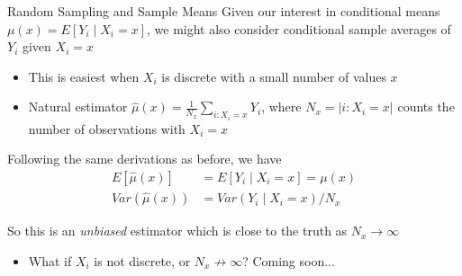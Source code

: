 \documentclass[11pt,english,handout]{beamer}
\begin{document}
\begin{frame}{Random Sampling and Sample Means}
\vspace{0.2cm}
Given our interest in conditional means $\mu(x)=E[Y_i\mid X_i=x]$, we might also consider conditional sample averages of $Y_i$ given $X_i=x$
\pause{}


\begin{itemize}
\item This is easiest when $X_i$ is discrete with a small number of values $x$
\vspace{0.1cm}\pause{}
\item Natural estimator $\hat{\mu}(x)=\frac{1}{N_x}\sum_{i:X_i=x}Y_i$, where $N_x=|i:X_i=x|$ counts the number of observations with $X_i=x$
\end{itemize}
\vspace{0.4cm}
\pause{}

Following the same derivations as before, we have 
\begin{align*}
E[\hat{\mu}(x)]&=E[Y_i\mid X_i=x]=\mu(x)\\
Var(\hat{\mu}(x))&=Var(Y_i\mid X_i=x)/N_x
\end{align*}
\pause{}
\vspace{-0.2cm}

So this is an \emph{unbiased} estimator which is close to the truth as $N_x\rightarrow\infty$
\pause{}

\begin{itemize}
\item What if $X_i$ is not discrete, or $N_x\not\rightarrow\infty$? Coming soon...
\end{itemize}

\end{frame}
\end{document}
